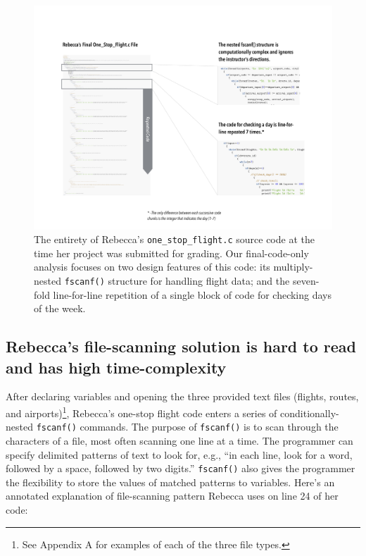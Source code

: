 \begin{figure}[htbp]
\centering
\includegraphics{RebeccasCode/OneStopFlightSupergraphic.pdf}
\caption{The entirety of Rebecca's \texttt{one\_stop\_flight.c} source code at the time her project was submitted for grading. Our final-code-only analysis focuses on two design features of this code: its multiply-nested \texttt{fscanf()} structure for handling flight data; and the seven-fold line-for-line repetition of a single block of code for checking days of the week.}
\end{figure}

\subsection{Rebecca's file-scanning solution is hard to read and has high time-complexity}\label{rebeccas-file-scanning-solution-is-hard-to-read-and-has-high-time-complexity}

After declaring variables and opening the three provided text files (flights, routes, and airports)\footnote{See Appendix A for examples of each of the three file types.}, Rebecca's one-stop flight code enters a series of conditionally-nested \texttt{fscanf()} commands. The purpose of \texttt{fscanf()} is to scan through the characters of a file, most often scanning one line at a time. The programmer can specify delimited patterns of text to look for, e.g., ``in each line, look for a word, followed by a space, followed by two digits.'' \texttt{fscanf()} also gives the programmer the flexibility to store the values of matched patterns to variables. Here's an annotated explanation of file-scanning pattern Rebecca uses on line 24 of her code:

